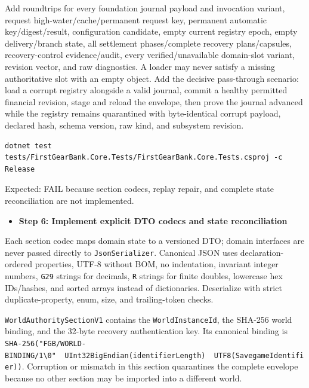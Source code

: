 \documentclass[
  10pt,
  letterpaper,
]{article}
\newcommand{\passthrough}[1]{#1}
\providecommand{\tightlist}{%
  \setlength{\itemsep}{0pt}\setlength{\parskip}{0pt}}
\begin{document}
Add roundtrips for every foundation journal payload and invocation
variant, request high-water/\allowbreak{}cache/\allowbreak{}permanent
request key, permanent automatic
key/\allowbreak{}digest/\allowbreak{}result, configuration candidate,
empty current registry epoch, empty delivery/branch state, all
settlement phases/complete recovery plans/capsules, recovery-control
evidence/audit, every verified/unavailable domain-slot variant, revision
vector, and raw diagnostics. A loader may never satisfy a missing
authoritative slot with an empty object. Add the decisive pass-through
scenario: load a corrupt registry alongside a valid journal, commit a
healthy permitted financial revision, stage and reload the envelope,
then prove the journal advanced while the registry remains quarantined
with byte-identical corrupt payload, declared hash, schema version, raw
kind, and subsystem revision.

\begin{lstlisting}
dotnet test tests/FirstGearBank.Core.Tests/FirstGearBank.Core.Tests.csproj -c Release
\end{lstlisting}

Expected: FAIL because section codecs, replay repair, and complete state
reconciliation are not implemented.

\begin{itemize}
\tightlist
\item[$\square$]
  \textbf{Step 6: Implement explicit DTO codecs and state
  reconciliation}
\end{itemize}

Each section codec maps domain state to a versioned DTO; domain
interfaces are never passed directly to
\passthrough{\lstinline!JsonSerializer!}. Canonical JSON uses
declaration-ordered properties, UTF-8 without BOM, no indentation,
invariant integer numbers, \passthrough{\lstinline!G29!} strings for
decimals, \passthrough{\lstinline!R!} strings for finite doubles,
lowercase hex IDs/hashes, and sorted arrays instead of dictionaries.
Deserialize with strict duplicate-property, enum, size, and
trailing-token checks.

\passthrough{\lstinline!WorldAuthoritySectionV1!} contains the
\passthrough{\lstinline!WorldInstanceId!}, the SHA-256 world binding,
and the 32-byte recovery authentication key. Its canonical binding is
\texttt{SHA-}\allowbreak{}\texttt{256(}\allowbreak{}\texttt{"FGB/}\allowbreak{}\texttt{WORLD-}\allowbreak{}\texttt{BINDING/}\allowbreak{}\texttt{1\textbackslash{}}\allowbreak{}\texttt{0"\ }\allowbreak{}\texttt{\textbar{}}\allowbreak{}\texttt{\textbar{}}\allowbreak{}\texttt{\ }\allowbreak{}\texttt{UInt32BigEndian(}\allowbreak{}\texttt{identifierLength)}\allowbreak{}\texttt{\ }\allowbreak{}\texttt{\textbar{}}\allowbreak{}\texttt{\textbar{}}\allowbreak{}\texttt{\ }\allowbreak{}\texttt{UTF8(}\allowbreak{}\texttt{SavegameIdentifier)}\allowbreak{}\texttt{)}\allowbreak{}.
Corruption or mismatch in this section quarantines the complete envelope
because no other section may be imported into a different world.
\end{document}
